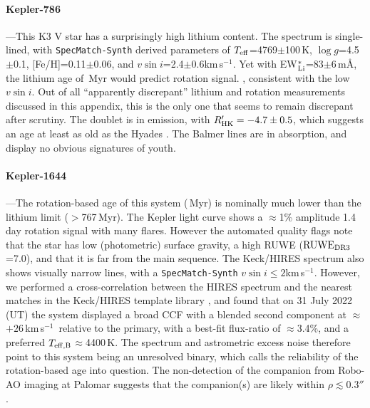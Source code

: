 \documentclass[11pt,twocolumn,tighten]{aastex63}
\newcommand{\kms}{{km\,s$^{-1}$}}
\begin{document}


\paragraph{Kepler-786}---This K3 V star has a surprisingly high
lithium content.  The spectrum is single-lined, with
\texttt{SpecMatch-Synth} derived parameters of $T_{\rm
eff}$=4769$\pm$100\,K, $\log g$=4.5$\pm$0.1, [Fe/H]=0.11$\pm$0.06, and
$v\sin i$=2.4$\pm$0.6\kms.  Yet with EW$_{\rm
Li}^{\ast}$=83$\pm$6\,m\AA, the lithium age of \kepseveneightsix\,Myr
would predict  rotation signal.  , consistent with the low $v\sin i$.  Out of all
``apparently discrepant'' lithium and rotation measurements discussed
in this appendix, this is the only one that seems to remain discrepant
after scrutiny.  The   doublet is in emission, with
$R'_{\rm HK}=-4.7\pm0.5$, which suggests an age at least as old as the
Hyades \citep{Mamajek_2008}.  The Balmer lines are in absorption, and
display no obvious signatures of youth.


\paragraph{Kepler-1644}---The rotation-based age of this system
(\kepsixteenfourfour\,Myr) is nominally much lower than the lithium
limit ($>$767\,Myr).  The Kepler light curve shows a $\approx$1\%
amplitude 1.4\,day rotation signal with many flares.  However the
automated quality flags note that the star has low (photometric)
surface gravity, a high RUWE (${\rm RUWE}_{\rm DR3}$=7.0), and that it
is far from the main sequence.  The Keck/HIRES spectrum also shows
visually narrow lines, with a \texttt{SpecMatch-Synth} $v \sin i \leq
2$\kms.  However, we performed a cross-correlation between the HIRES
spectrum and the nearest matches in the Keck/HIRES template library
\citep{2015AJ....149...18K}, and found that on 31 July 2022 (UT) the
system displayed a broad CCF with a blended second component at
$\approx$$+26$\,\kms\ relative to the primary, with a best-fit
flux-ratio of $\approx$3.4\%, and a preferred $T_{\rm
eff,B}$$\approx$4400\,K.  The spectrum and astrometric excess noise
therefore point to this system being an unresolved binary, which calls
the reliability of the rotation-based age into question.  The
non-detection of the companion from Robo-AO imaging at Palomar
\citep{2017AJ....153...66Z} suggests that the companion(s) are likely
within $\rho$$\lesssim$0.3$''$.
\end{document}
